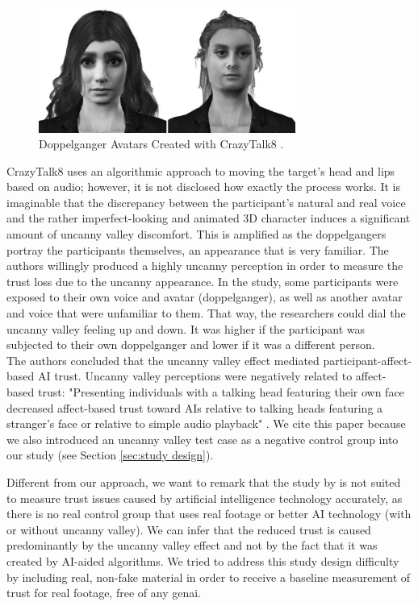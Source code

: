 \documentclass[
  a4paper,  %
  twoside,  %
  bibliography=totoc,
  headsepline,
  cleardoublepage=empty,
  parskip=half,
  draft=false
]{scrbook}
\begin{document}
\begin{figure}[h]
  \centering
  \includegraphics[width=0.75\textwidth]{./graphics/uncanny-avatars.png}
  \caption{Doppelganger Avatars Created with CrazyTalk8 \cite{weismanFaceUncannyEffects2021}.}
  \label{fig:uncanny-avatars}
\end{figure}

CrazyTalk8 uses an algorithmic approach to moving the target's head and lips based on audio; however, it is not disclosed how exactly the process works. It is imaginable that the discrepancy between the participant's natural and real voice and the rather imperfect-looking and animated 3D character induces a significant amount of uncanny valley discomfort. This is amplified as the doppelgangers portray the participants themselves, an appearance that is very familiar. The authors willingly produced a highly uncanny perception in order to measure the trust loss due to the uncanny appearance. In the study, some participants were exposed to their own voice and avatar (doppelganger), as well as another avatar and voice that were unfamiliar to them. That way, the researchers could dial the uncanny valley feeling up and down. It was higher if the participant was subjected to their own doppelganger and lower if it was a different person.\\
The authors concluded that the uncanny valley effect mediated participant-affect-based AI trust. Uncanny valley perceptions were negatively related to affect-based trust: "Presenting individuals with a talking head featuring their own face decreased affect-based trust toward AIs relative to talking heads featuring a stranger's face or relative to simple audio playback" \cite{weismanFaceUncannyEffects2021}. We cite this paper because we also introduced an uncanny valley test case as a negative control group into our study (see Section \ref{sec:study design}). 

Different from our approach, we want to remark that the study by  is not suited to measure trust issues caused by artificial intelligence technology accurately, as there is no real control group that uses real footage or better AI technology (with or without uncanny valley). We can infer that the reduced trust is caused predominantly by the uncanny valley effect and not by the fact that it was created by AI-aided algorithms. We tried to address this study design difficulty by including real, non-fake material in order to receive a baseline measurement of trust for real footage, free of any \gls{genai}.
\end{document}
